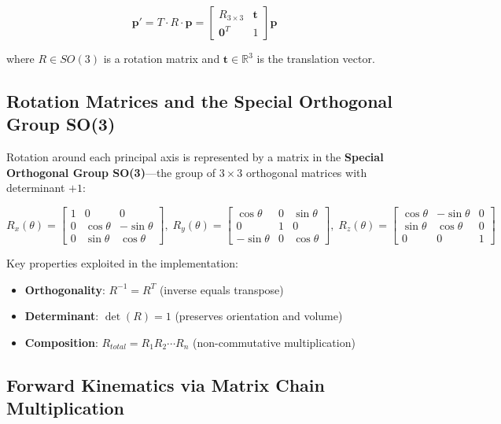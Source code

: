 \documentclass[11pt]{article}
\begin{document}
\[
\mathbf{p}' = T \cdot R \cdot \mathbf{p} = \begin{bmatrix} R_{3\times3} & \mathbf{t} \\ \mathbf{0}^T & 1 \end{bmatrix} \mathbf{p}
\]

where $R \in SO(3)$ is a rotation matrix and $\mathbf{t} \in \mathbb{R}^3$ is the translation vector.

\subsection{Rotation Matrices and the Special Orthogonal Group SO(3)}

Rotation around each principal axis is represented by a matrix in the \textbf{Special Orthogonal Group SO(3)}---the group of $3 \times 3$ orthogonal matrices with determinant $+1$:

\begin{equation}
R_x(\theta) = \begin{bmatrix}
1 & 0 & 0 \\
0 & \cos\theta & -\sin\theta \\
0 & \sin\theta & \cos\theta
\end{bmatrix}, \;
R_y(\theta) = \begin{bmatrix}
\cos\theta & 0 & \sin\theta \\
0 & 1 & 0 \\
-\sin\theta & 0 & \cos\theta
\end{bmatrix}, \;
R_z(\theta) = \begin{bmatrix}
\cos\theta & -\sin\theta & 0 \\
\sin\theta & \cos\theta & 0 \\
0 & 0 & 1
\end{bmatrix}
\end{equation}

Key properties exploited in the implementation:
\begin{itemize}[nosep]
    \item \textbf{Orthogonality}: $R^{-1} = R^T$ (inverse equals transpose)
    \item \textbf{Determinant}: $\det(R) = 1$ (preserves orientation and volume)
    \item \textbf{Composition}: $R_{total} = R_1 R_2 \cdots R_n$ (non-commutative multiplication)
\end{itemize}

\subsection{Forward Kinematics via Matrix Chain Multiplication}
\end{document}
